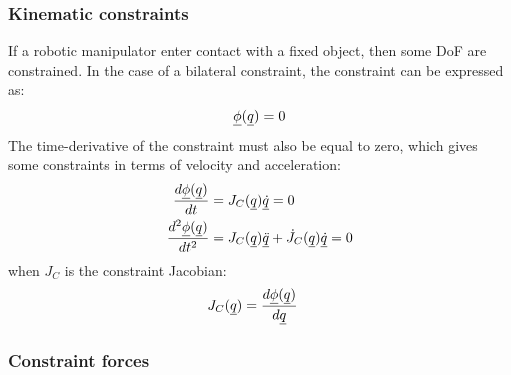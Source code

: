 {\subsubsection{Kinematic constraints}
\label{sec:constraints}
%
If a robotic manipulator enter contact with a fixed object, then some DoF are constrained. In the case of a bilateral constraint, the constraint can be expressed as:
\begin{align}
\underline{\phi}( \underline{ q } ) = 0
\label{eq:constraint}
\end{align}
%
The time-derivative of the constraint must also be equal to zero, which gives some constraints in terms of velocity and acceleration:
\begin{align}
\frac{d \underline{\phi}( \underline{ q } ) }{dt}     &= J_C( \underline{ q } ) \underline{\dot{q}}  = 0 \\
\frac{d^2 \underline{\phi}( \underline{ q } ) }{dt^2} &= J_C( \underline{ q } ) \underline{\ddot{q}}  + \dot{J}_C( \underline{ q } ) \underline{\dot{q}} = 0 
\label{eq:constraint_diff}
\end{align}
%
when $J_C$ is the constraint Jacobian:
%
\begin{align}
J_C( \underline{ q } )                    &= \frac{d \underline{\phi}( \underline{ q } ) }{d\underline{ q }}
\label{eq:constraint_jaco}
\end{align}

\subsubsection{Constraint forces}
\label{sec:constraint_forces}

}
